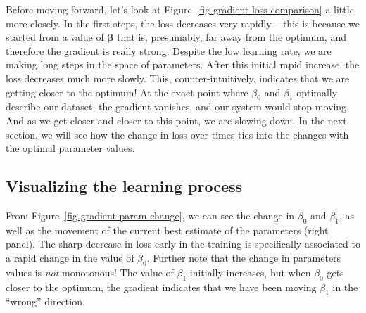 \documentclass[
  letterpaper,
]{scrbook}
\begin{document}
Before moving forward, let's look at
Figure~\ref{fig-gradient-loss-comparison} a little more closely. In the
first steps, the loss decreases very rapidly -- this is because we
started from a value of \(\mathbf{\beta}\) that is, presumably, far away
from the optimum, and therefore the gradient is really strong. Despite
the low learning rate, we are making long steps in the space of
parameters. After this initial rapid increase, the loss decreases much
more slowly. This, counter-intuitively, indicates that we are getting
closer to the optimum! At the exact point where \(\beta_0\) and
\(\beta_1\) optimally describe our dataset, the gradient vanishes, and
our system would stop moving. And as we get closer and closer to this
point, we are slowing down. In the next section, we will see how the
change in loss over times ties into the changes with the optimal
parameter values.

\subsection{Visualizing the learning
process}\label{visualizing-the-learning-process}

From Figure~\ref{fig-gradient-param-change}, we can see the change in
\(\beta_0\) and \(\beta_1\), as well as the movement of the current best
estimate of the parameters (right panel). The sharp decrease in loss
early in the training is specifically associated to a rapid change in
the value of \(\beta_0\). Further note that the change in parameters
values is \emph{not} monotonous! The value of \(\beta_1\) initially
increases, but when \(\beta_0\) gets closer to the optimum, the gradient
indicates that we have been moving \(\beta_1\) in the ``wrong''
direction.

\begin{figure}[bt]



\end{figure}%
\end{document}
